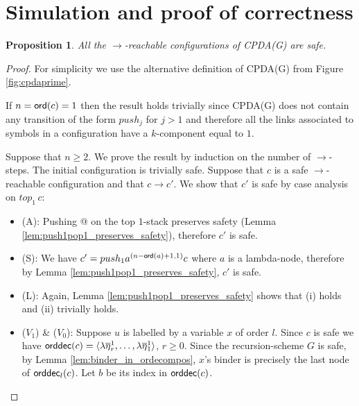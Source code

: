 \documentclass[a4paper]{article}
\newtheorem{proposition}{Proposition}[section]
\theoremstyle{remark}
\theoremstyle{definition}
\newcommand\orddec{{\sf orddec}}
\begin{document}
\section{Simulation and proof of correctness}
\begin{proposition}
All the $\rightarrow$-reachable configurations of CPDA(G) are safe.
\end{proposition}
\begin{proof}
For simplicity we use the alternative definition of CPDA(G) from Figure \ref{fig:cpdaprime}.

If $n ={\sf ord}(c) =1$ then the result holds trivially since CPDA(G) does not contain
any transition of the form $push_j$ for $j>1$ and therefore all the links associated to symbols in a configuration have a $k$-component equal to $1$.

Suppose that $n\geq 2$. We prove the result by induction on the number of
$\rightarrow$-steps. The initial configuration is trivially safe.
Suppose that $c$ is a safe $\rightarrow$-reachable configuration and that
$c \rightarrow c'$.
We show that $c'$ is safe by case analysis on $top_1\,c$:
\begin{itemize}
\item (A): Pushing @ on the top $1$-stack preserves safety (Lemma
\ref{lem:push1pop1_preserves_safety}), therefore $c'$ is safe.

\item (S):
We have $c' = push_1 a^{(n-{\sf ord}(a)+1,1)} c$ where $a$ is a
lambda-node, therefore by Lemma \ref{lem:push1pop1_preserves_safety},
$c'$ is safe.

\item (L): Again, Lemma \ref{lem:push1pop1_preserves_safety}
shows that (i) holds and (ii) trivially holds.

\item ($V_1$) \& ($V_0$): Suppose $u$ is labelled by a variable $x$ of order $l$.
Since $c$ is safe we have $\orddec(c) = \langle \lambda
\overline{\eta}_r^1 , \ldots, \lambda \overline{\eta}_1^1
\rangle$, $r\geq 0$. Since the recursion-scheme $G$ is safe, by Lemma \ref{lem:binder_in_ordecompos}, $x$'s binder is precisely the last node of $\orddec_l(c)$. Let $b$ be its index in $\orddec(c)$.

\end{itemize}
\end{proof}
\end{document}
